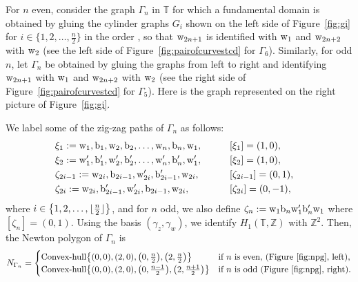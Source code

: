 \documentclass[pdftex]{sigma}
\numberwithin{equation}{section}
\DeclarePairedDelimiter\floor{\lfloor}{\rfloor}
\newcommand{\Z}{{\mathbb Z}}
\newcommand{\T}{{\mathbb T}}
\newcommand{\w}{{\rm w}}
\newcommand{\bw}{{\rm b}}
\begin{document}
	For $n$ even, consider the graph $\Gamma_n$ in $\T$ for which a fundamental domain is obtained by gluing the cylinder graphs $G_i$ shown on the left side of Figure~\ref{fig:gi} for $i \in \bigl\{1,2,\dots,\frac{n}{2}\bigr\}$ in the order , so that $\w_{2n+1}$ is identified with $\w_1$ and $\w_{2n+2}$ with $\w_2$ (see the left side of Figure~\ref{fig:pairofcurvestcd} for $\Gamma_6$). Similarly, for odd $n$, let $\Gamma_n$ be obtained by gluing the graphs  from left to right and identifying $\w_{2n+1}$ with $\w_1$ and $\w_{2n+2}$ with $\w_2$ (see the right side of Figure~\ref{fig:pairofcurvestcd} for $\Gamma_5$). Here  is the graph represented on the right picture of Figure~\ref{fig:gi}.
	
	
	We label some of the zig-zag paths of $\Gamma_n$ as follows:
	\begin{alignat*}{3}
		&\xi_{1}:= \w_1,\bw_1,\w_2,\bw_2,\dots,\w_{n},\bw_{n},\w_{1}, \qquad&& [\xi_1]=(1,0),&\\
		&\xi_{2}:= \w_1',\bw_1',\w_2',\bw_2',\dots,\w_{n}',\bw_{n}',\w_{1}', \qquad&& [\xi_2]=(1,0),&\\
		&\zeta_{2i-1}:= \w_{2i}, \bw_{2i-1}, \w_{2i}', \bw_{2i-1}',\w_{2i}, \qquad&& [\zeta_{2i-1}]=(0,1),&\\
		&\zeta_{2i}:= \w_{2i}, \bw_{2i-1}', \w_{2i}', \bw_{2i-1},\w_{2i}, \qquad&& [\zeta_{2i}]=(0,-1),&
	\end{alignat*}
	where $i \in \bigl\{1,2,\dots,\floor{\frac n 2}\bigr\}$, and for $n$ odd, we also define $\zeta_n := \w_1 \bw_n \w_1' \bw_n' \w_1$ where $[\zeta_n]= (0,1)$. Using the basis $(\gamma_z,\gamma_w)$, we identify $H_1(\T,\Z)$ with $\Z^2$. Then, the Newton polygon of $\Gamma_n$ is
	\begin{gather*}
	N_{\Gamma_n}= \begin{cases}
		\operatorname{Convex-hull}\bigl\{(0,0), (2,0),\bigl(0,\frac n 2 \bigr), \bigl(2,\frac n 2 \bigr)\bigr\} &\text{if $n$ is even, (Figure~\ref{fig:npg}, left),}\\
		\text{Convex-hull}\bigl\{(0,0), (2,0),\bigl(0,\frac{n-1}{2}\bigr), \bigl(2,\frac{n+1}{ 2}\bigr)\bigr\} &\text{if $n$ is odd (Figure~\ref{fig:npg}, right).}
	\end{cases}
	\end{gather*}
	
\end{document}

